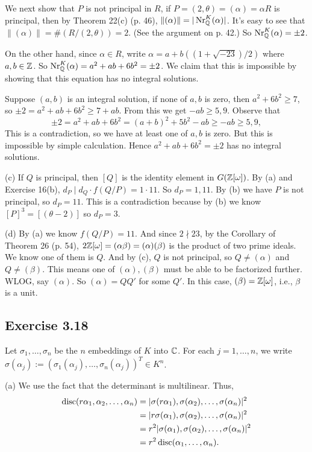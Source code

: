 \documentclass[../Marcus.tex]{subfiles}
\begin{document}
We next show that $P$ is not principal in $R$, if $P=(2,\theta)=(\alpha)=\alpha R$ is principal, then by Theorem 22(c) (p. 46), $\|(\alpha)\|=|\operatorname{Nr}^K_{\mathbb{Q}}(\alpha)|$. It's easy to see that $\|(\alpha)\|=\#(R/(2,\theta))=2$. (See the argument on p. 42.) So $\operatorname{Nr}^K_{\mathbb{Q}}(\alpha)=\pm 2$.

On the other hand, since $\alpha\in R$, write $\alpha=a+b((1+\sqrt{-23})/2)$ where $a,b\in\mathbb{Z}$. So $\operatorname{Nr}^K_{\mathbb{Q}}(\alpha)=a^2+ab+6b^2=\pm 2$. We claim that this is impossible by showing that this equation has no integral solutions.

Suppose $(a,b)$ is an integral solution, if none of $a,b$ is zero, then $a^2+6b^2\geq 7$, so $\pm2 = a^2+ab+6b^2 \geq 7+ab$. From this we get $-ab\geq 5,9$. Observe that 
$$
\pm2 = a^2+ab+6b^2 = (a+b)^2+5b^2-ab \geq -ab \geq 5,9,
$$
This is a contradiction, so we have at least one of $a,b$ is zero. But this is impossible by simple calculation. Hence $a^2+ab+6b^2=\pm2$ has no integral solutions.

(c) If $Q$ is principal, then $[Q]$ is the identity element in $G(\mathbb{Z}[\omega])$. By (a) and Exercise 16(b), $d_P\mid d_Q\cdot f(Q/P)=1\cdot 11$. So $d_P=1,11$. By (b) we have $P$ is not principal, so $d_P=11$. This is a contradiction because by (b) we know $[P]^3=[(\theta-2)]$ so $d_P=3$.

(d) By (a) we know $f(Q/P)=11$. And since $2\nmid 23$, by the Corollary of Theorem 26 (p. 54), $2\mathbb{Z}[\omega]=(\alpha\beta)=(\alpha)(\beta)$ is the product of two prime ideals. We know one of them is $Q$. And by (c), $Q$ is not principal, so $Q\neq (\alpha)$ and $Q\neq(\beta)$. This means one of $(\alpha),(\beta)$ must be able to be factorized further. WLOG, say $(\alpha)$. So $(\alpha)=QQ'$ for some $Q'$. In this case, $(\beta)=\mathbb{Z}[\omega]$, i.e., $\beta$ is a unit.

\subsection*{Exercise 3.18}

Let $\sigma_1,\ldots,\sigma_n$ be the $n$ embeddings of $K$ into $\mathbb{C}$. For each $j=1,\ldots,n$, we write $\sigma(\alpha_j):=(\sigma_1(\alpha_j),\ldots,\sigma_n(\alpha_j))^T\in K^n$.

(a) We use the fact that the determinant is multilinear. Thus,
\begin{align*}
    \operatorname{disc}(r\alpha_1,\alpha_2,\ldots,\alpha_n) &= |\sigma(r\alpha_1),\sigma(\alpha_2),\ldots,\sigma(\alpha_n)|^2 \\
    &= |r\sigma(\alpha_1),\sigma(\alpha_2),\ldots,\sigma(\alpha_n)|^2 \\
    &= r^2|\sigma(\alpha_1),\sigma(\alpha_2),\ldots,\sigma(\alpha_n)|^2 \\
    &= r^2\operatorname{disc}(\alpha_1,\ldots,\alpha_n).
\end{align*}
\end{document}
